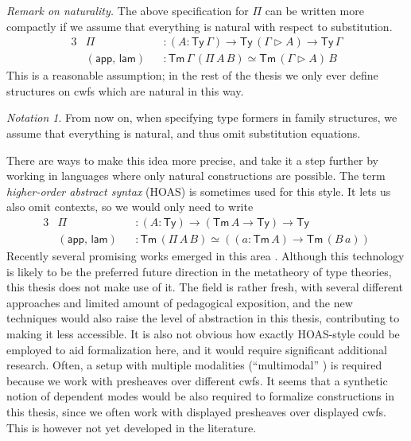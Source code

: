 \documentclass[12pt,a4paper,twoside,openany]{book}
\theoremstyle{remark}
\newtheorem{notation}{Notation}
\theoremstyle{definition}
\theoremstyle{theorem}
\newcommand{\ms}[1]{\mathsf{#1}}
\newcommand{\Tm}{\mathsf{Tm}}
\newcommand{\Ty}{\mathsf{Ty}}
\newcommand{\ext}{\triangleright}
\newcommand{\app}{\ms{app}}
\newcommand{\lam}{\ms{lam}}
\begin{document}
\emph{Remark on naturality.} The above specification for $\Pi$ can be written
more compactly if we assume that everything is natural with respect to
substitution.
\begin{alignat*}{3}
  &\Pi            &&: (A : \Ty\,\Gamma) \to \Ty\,(\Gamma\ext A) \to \Ty\,\Gamma\\
  & (\app,\,\lam) &&: \Tm\,\Gamma\,(\Pi\,A\,B) \simeq \Tm\,(\Gamma \ext A)\,B
\end{alignat*}
This is a reasonable assumption; in the rest of the thesis we only ever define
structures on cwfs which are natural in this way.

\begin{notation} From now on, when specifying type formers in family structures,
we assume that everything is natural, and thus omit substitution equations.
\end{notation}

There are ways to make this idea more precise, and take it a step further by
working in languages where only natural constructions are possible. The term
\emph{higher-order abstract syntax} (HOAS) is sometimes used for this style. It lets us
also omit contexts, so we would only need to write
\begin{alignat*}{3}
  &\Pi            &&: (A : \Ty) \to (\Tm\,A \to \Ty) \to \Ty\\
  & (\app,\,\lam) &&: \Tm\,(\Pi\,A\,B) \simeq ((a : \Tm\,A) \to \Tm\,(B\,a))
\end{alignat*}
Recently several promising works emerged in this area
\cite{uemura,ctt-normalization,bocquet2021induction}. Although this technology
is likely to be the preferred future direction in the metatheory of type
theories, this thesis does not make use of it. The field is rather fresh, with
several different approaches and limited amount of pedagogical exposition, and
the new techniques would also raise the level of abstraction in this thesis,
contributing to making it less accessible. It is also not obvious how exactly
HOAS-style could be employed to aid formalization here, and it would require
significant additional research.  Often, a setup with multiple modalities
(``multimodal'' \cite{gratzer20multimodal}) is required
\cite{bocquet2021induction} because we work with presheaves over different
cwfs. It seems that a synthetic notion of dependent modes would be also required
to formalize constructions in this thesis, since we often work with displayed
presheaves over displayed cwfs. This is however not yet developed in the
literature.
\end{document}
